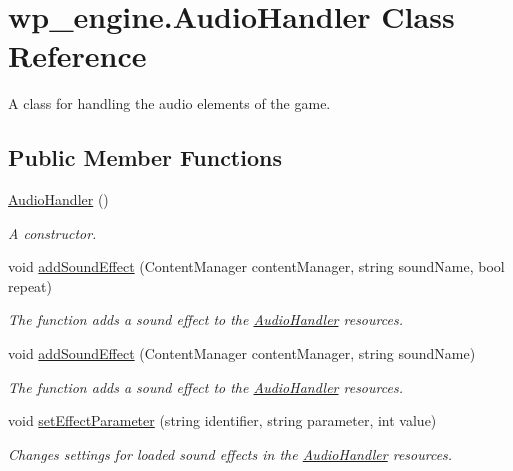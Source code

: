 \hypertarget{classwp__engine_1_1_audio_handler}{\section{wp\-\_\-engine.\-Audio\-Handler Class Reference}
\label{classwp__engine_1_1_audio_handler}
}


A class for handling the audio elements of the game.  


\subsection*{Public Member Functions}
\begin{DoxyCompactItemize}
\item 
\hyperlink{classwp__engine_1_1_audio_handler_a40773dc4af528f42ae21b588f686fb3e}{Audio\-Handler} ()
\begin{DoxyCompactList}\small\item\em A constructor. \end{DoxyCompactList}\item 
void \hyperlink{classwp__engine_1_1_audio_handler_a8b541aa280225b6116582937d36a8ac3}{add\-Sound\-Effect} (Content\-Manager content\-Manager, string sound\-Name, bool repeat)
\begin{DoxyCompactList}\small\item\em The function adds a sound effect to the \hyperlink{classwp__engine_1_1_audio_handler}{Audio\-Handler} resources. \end{DoxyCompactList}\item 
void \hyperlink{classwp__engine_1_1_audio_handler_af78298b6c184872f9bb9bec06bc526a2}{add\-Sound\-Effect} (Content\-Manager content\-Manager, string sound\-Name)
\begin{DoxyCompactList}\small\item\em The function adds a sound effect to the \hyperlink{classwp__engine_1_1_audio_handler}{Audio\-Handler} resources. \end{DoxyCompactList}\item 
void \hyperlink{classwp__engine_1_1_audio_handler_ad55e26b0be9cd097de05fb88354b1406}{set\-Effect\-Parameter} (string identifier, string parameter, int value)
\begin{DoxyCompactList}\small\item\em Changes settings for loaded sound effects in the \hyperlink{classwp__engine_1_1_audio_handler}{Audio\-Handler} resources. \end{DoxyCompactList}\item 

\end{DoxyCompactItemize}
